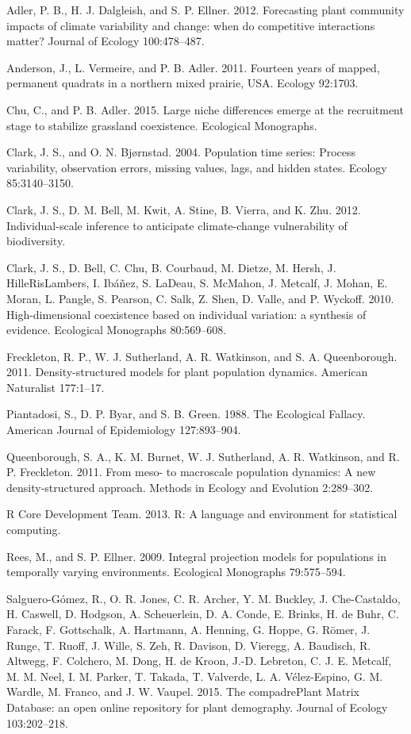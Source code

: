 \documentclass[12pt,]{article}
\begin{document}
Adler, P. B., H. J. Dalgleish, and S. P. Ellner. 2012. Forecasting plant
community impacts of climate variability and change: when do competitive
interactions matter? Journal of Ecology 100:478--487.

Anderson, J., L. Vermeire, and P. B. Adler. 2011. Fourteen years of
mapped, permanent quadrats in a northern mixed prairie, USA. Ecology
92:1703.

Chu, C., and P. B. Adler. 2015. Large niche differences emerge at the
recruitment stage to stabilize grassland coexistence. Ecological
Monographs.

Clark, J. S., and O. N. Bjørnstad. 2004. Population time series: Process
variability, observation errors, missing values, lags, and hidden
states. Ecology 85:3140--3150.

Clark, J. S., D. M. Bell, M. Kwit, A. Stine, B. Vierra, and K. Zhu.
2012. Individual-scale inference to anticipate climate-change
vulnerability of biodiversity.

Clark, J. S., D. Bell, C. Chu, B. Courbaud, M. Dietze, M. Hersh, J.
HilleRisLambers, I. Ibáñez, S. LaDeau, S. McMahon, J. Metcalf, J. Mohan,
E. Moran, L. Pangle, S. Pearson, C. Salk, Z. Shen, D. Valle, and P.
Wyckoff. 2010. High-dimensional coexistence based on individual
variation: a synthesis of evidence. Ecological Monographs 80:569--608.

Freckleton, R. P., W. J. Sutherland, A. R. Watkinson, and S. A.
Queenborough. 2011. Density-structured models for plant population
dynamics. American Naturalist 177:1--17.

Piantadosi, S., D. P. Byar, and S. B. Green. 1988. The Ecological
Fallacy. American Journal of Epidemiology 127:893--904.

Queenborough, S. A., K. M. Burnet, W. J. Sutherland, A. R. Watkinson,
and R. P. Freckleton. 2011. From meso- to macroscale population
dynamics: A new density-structured approach. Methods in Ecology and
Evolution 2:289--302.

R Core Development Team. 2013. R: A language and environment for
statistical computing.

Rees, M., and S. P. Ellner. 2009. Integral projection models for
populations in temporally varying environments. Ecological Monographs
79:575--594.

Salguero-Gómez, R., O. R. Jones, C. R. Archer, Y. M. Buckley, J.
Che-Castaldo, H. Caswell, D. Hodgson, A. Scheuerlein, D. A. Conde, E.
Brinks, H. de Buhr, C. Farack, F. Gottschalk, A. Hartmann, A. Henning,
G. Hoppe, G. Römer, J. Runge, T. Ruoff, J. Wille, S. Zeh, R. Davison, D.
Vieregg, A. Baudisch, R. Altwegg, F. Colchero, M. Dong, H. de Kroon,
J.-D. Lebreton, C. J. E. Metcalf, M. M. Neel, I. M. Parker, T. Takada,
T. Valverde, L. A. Vélez-Espino, G. M. Wardle, M. Franco, and J. W.
Vaupel. 2015. The compadrePlant Matrix Database: an open online
repository for plant demography. Journal of Ecology 103:202--218.
\end{document}
